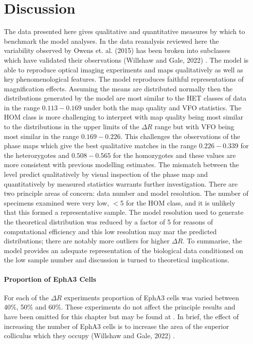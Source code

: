 \section{Discussion}
The data presented here gives qualitative and quantitative measures by which to benchmark the model analyses. In the data reanalysis reviewed here the variability observed by Owens et. al. (2015) has been broken into subclasses which have validated their observations (Willshaw and Gale, 2022) \cite{Willshaw2022-fs}. The model is able to reproduce optical imaging experiments and maps qualitatively as well as key phenomenological features. The model reproduces faithful representations of magnification effects. Assuming the means are distributed normally then the distributions generated by the model are most similar to the HET classes of data in the range $0.113-0.169$ under both the map quality and VFO statistics. The HOM class is more challenging to interpret with map quality being most similar to the distributions in the upper limits of the $\Delta R$ range but with VFO being most similar in the range $0.169-0.226$. This challenges the observations of the phase maps which give the best qualitative matches in the range $0.226-0.339$ for the heterozygotes and $0.508-0.565$ for the homozygotes and these values are more consistent with  previous modelling estimates. The mismatch between the level predict qualitatively by visual inspection of the phase map and quantitatively by measured statistics warrants further investigation. There are two principle areas of concern: data number and model resolution. The number of specimens examined were very low, $<$5 for the HOM class, and it is unlikely that this formed a representative sample. The model resolution used to generate the theoretical distribution was reduced by a factor of 5 for reasons of computational efficiency and this low resolution may mar the predicted distributions; there are notably more outliers for higher $\Delta R$. To summarise, the model provides an adequate representation of the biological data conditioned on the low sample number and discussion is turned to theoretical implications.
\paragraph{Proportion of EphA3 Cells}
For each of the $\Delta R$ experiments proportion of EphA3 cells was varied between 40\%, 50\% and 60\%. These experiments do not affect the principle results and have been omitted for this chapter but may be found at \cite{LatticeEphA3}. In brief, the effect of increasing the number of EphA3 cells is to increase the area of the superior colliculus which they occupy (Willshaw and Gale, 2022) \cite{Willshaw2022-fs}. 
